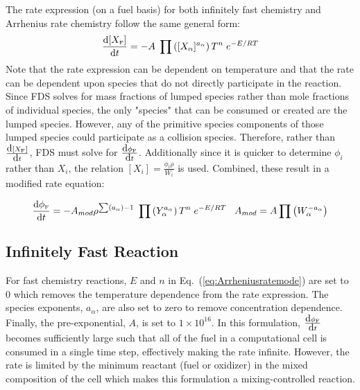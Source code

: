 \label{Reaction_Rate_Model}

The rate expression (on a fuel basis) for both infinitely fast chemistry and Arrhenius rate chemistry follow the same general form:
\begin{equation}\label{eq:Arrheniusrateeqn}
\frac{\mbox{d}[X_{\tiny \hbox{F}}]}{\mbox{d}t} = -A \; \prod \left([X_{\alpha}]^{a_{\alpha}} \right) T^n \; e^{-E/RT} 
\end{equation}
Note that the rate expression can be dependent on temperature and that the rate can be dependent upon species that do not directly participate in the reaction. Since FDS solves for mass fractions of lumped species rather than mole fractions of individual species, the only "species" that can be consumed or created are the lumped species.  However, any of the primitive species components of those lumped species could participate as a collision species.  Therefore, rather than $\frac{\mbox{d}[X_{\tiny \hbox{F}}]}{\mbox{d}t}$,  FDS must solve for $\frac{\mbox{d}\phi_{\tiny \hbox{F}}}{\mbox{d}t}$.  Additionally since it is quicker to determine $\phi_i$ rather than $X_i$, the relation $[X_i]=\frac{\phi_i \rho}{W_i}$ is used.  Combined, these result in a modified rate equation:

\begin{equation}\label{eq:Arrheniusratemode}
\frac{\mbox{d}\phi_{\tiny \hbox{F}}}{\mbox{d}t} = -A_{mod} \rho^{\sum (a_{\alpha}) -1} \; \prod \left(Y_{\alpha}^{a_{\alpha}} \right) T^n \; e^{-E/RT} \;\;\; A_{mod} = A \prod \left(W_{\alpha}^{-a_{\alpha}} \right)  
\end{equation}

\subsection{Infinitely Fast Reaction}
For fast chemistry reactions, $E$ and $n$ in Eq.~(\ref{eq:Arrheniusratemode}) are set to $0$ which removes the temperature dependence from the rate expression. The species exponents, $a_{\alpha}$, are also set to zero to remove concentration dependence. Finally, the pre-exponential, $A$, is set to $1 \times 10^{16}$. In this formulation, $\frac{\mbox{d}\phi_{\tiny \hbox{F}}}{\mbox{d}t}$ becomes sufficiently large such that all of the fuel in a computational cell is consumed in a single time step, effectively making the rate infinite. However, the rate is limited by the minimum reactant (fuel or oxidizer) in the mixed composition of the cell which makes this formulation a mixing-controlled reaction.   

